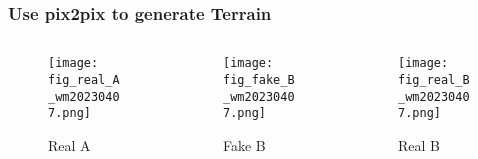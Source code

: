 \begin{frame}
    \frametitle{Use pix2pix to generate Terrain}
    \begin{columns}[c]
        \begin{column}{0.32\textwidth}
            \begin{figure}
                \texttt{[image: fig\_real\_A\_wm20230407.png]}
                \caption{Real A}
            \end{figure}
        \end{column}
        \begin{column}{0.32\textwidth}
            \begin{figure}
                \texttt{[image: fig\_fake\_B\_wm20230407.png]}
                \caption{Fake B}
            \end{figure}
        \end{column}
        \begin{column}{0.32\textwidth}
            \begin{figure}
                \texttt{[image: fig\_real\_B\_wm20230407.png]}
                \caption{Real B}
            \end{figure}
        \end{column}
    \end{columns}
\end{frame}